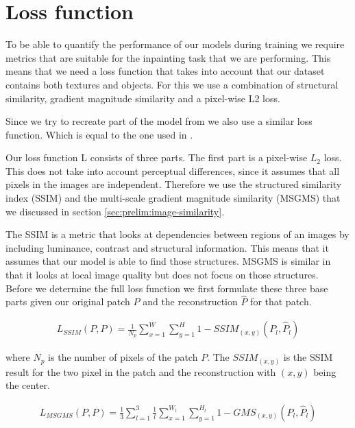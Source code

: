 \section{Loss function}
\label{sec:experimental-setup:loss}

To be able to quantify the performance of our models during training we require metrics that are suitable for the inpainting task that we are performing. This means that we need a loss function that takes into account that our dataset contains both textures and objects. For this we use a combination of structural similarity, gradient magnitude similarity and a pixel-wise L2 loss.

Since we try to recreate part of the model from \cite{pirnay_inpainting_2021} we also use a similar loss function. Which is equal to the one used in \cite{zavrtanik_reconstruction_2021}.

Our loss function L consists of three parts. The first part is a pixel-wise $L_2$ loss. This does not take into account perceptual differences, since it assumes that all pixels in the images are independent. Therefore we use the structured similarity index (SSIM) \cite{wang_image_2004} and the multi-scale gradient magnitude similarity (MSGMS) \cite{xue_gradient_2014, zhang_gradient_2017} that we discussed in section \ref{sec:prelim:image-similarity}.

The SSIM is a metric that looks at dependencies between regions of an images by including luminance, contrast and structural information. This means that it assumes that our model is able to find those structures. MSGMS is similar in that it looks at local image quality but does not focus on those structures.
\\
Before we determine the full loss function we first formulate these three base parts given our original patch $P$ and the reconstruction $\hat{P}$ for that patch.

\begin{align}
L_{SSIM}(P, P) = \frac{1}{N_p} \sum_{x=1}^{W}\sum_{y=1}^{H}{} {1 - SSIM_{(x,y)}(P_l, \hat{P}_l)}
\end{align}

where $N_p$ is the number of pixels of the patch $P$. The $SSIM_{(x,y)}$ is the SSIM result for the two pixel in the patch and the reconstruction with $(x,y)$ being the center.

\begin{align}
L_{MSGMS}(P, P) = \frac{1}{3} \sum_{l=1}^{3} \frac{1}{l} \sum_{x=1}^{W_l}\sum_{y=1}^{H_l}{} {1 - GMS_{(x,y)}(P_l, \hat{P}_l)}
\end{align}


